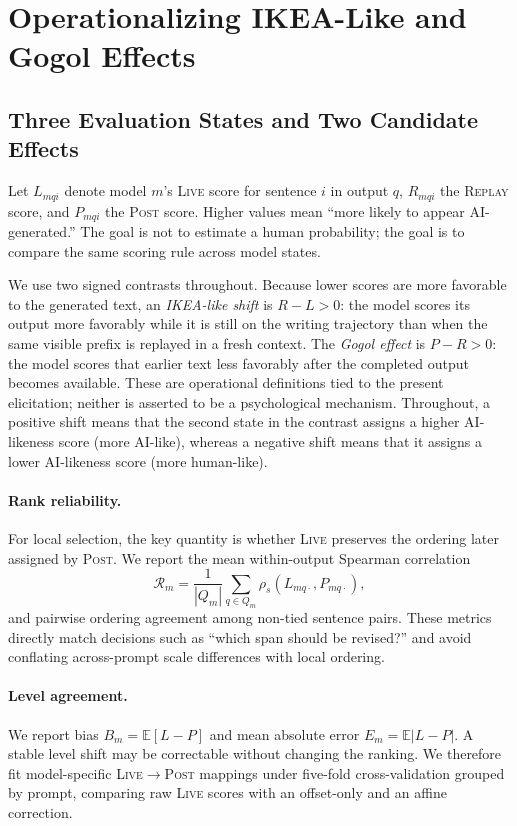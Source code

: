 \documentclass[10pt]{article}
\newcommand{\live}{\textsc{Live}}
\newcommand{\replay}{\textsc{Replay}}
\newcommand{\post}{\textsc{Post}}
\newcommand{\papersection}[1]{\Needspace{4.4\baselineskip}\section{#1}}
\newcommand{\papersubsection}[1]{\Needspace{3.8\baselineskip}\subsection{#1}}
\begin{document}
\papersection{Operationalizing IKEA-Like and Gogol Effects}
\papersubsection{Three Evaluation States and Two Candidate Effects}
Let $L_{mqi}$ denote model $m$'s \live{} score for sentence $i$ in output $q$, $R_{mqi}$ the \replay{} score, and $P_{mqi}$ the \post{} score. Higher values mean ``more likely to appear AI-generated.'' The goal is not to estimate a human probability; the goal is to compare the same scoring rule across model states.

We use two signed contrasts throughout. Because lower scores are more favorable to the generated text, an \emph{IKEA-like shift} is $R-L>0$: the model scores its output more favorably while it is still on the writing trajectory than when the same visible prefix is replayed in a fresh context. The \emph{Gogol effect} is $P-R>0$: the model scores that earlier text less favorably after the completed output becomes available. These are operational definitions tied to the present elicitation; neither is asserted to be a psychological mechanism. Throughout, a positive shift means that the second state in the contrast assigns a higher AI-likeness score (more AI-like), whereas a negative shift means that it assigns a lower AI-likeness score (more human-like).

\paragraph{Rank reliability.}
For local selection, the key quantity is whether \live{} preserves the ordering later assigned by \post{}. We report the mean within-output Spearman correlation
\begin{equation}
\mathcal{R}_m=\frac{1}{|Q_m|}\sum_{q\in Q_m}\rho_s(L_{mq\cdot},P_{mq\cdot}),
\end{equation}
and pairwise ordering agreement among non-tied sentence pairs. These metrics directly match decisions such as ``which span should be revised?'' and avoid conflating across-prompt scale differences with local ordering.

\paragraph{Level agreement.}
We report bias $B_m=\mathbb{E}[L-P]$ and mean absolute error $E_m=\mathbb{E}|L-P|$. A stable level shift may be correctable without changing the ranking. We therefore fit model-specific \live{}$\rightarrow$\post{} mappings under five-fold cross-validation grouped by prompt, comparing raw \live{} scores with an offset-only and an affine correction.
\end{document}
